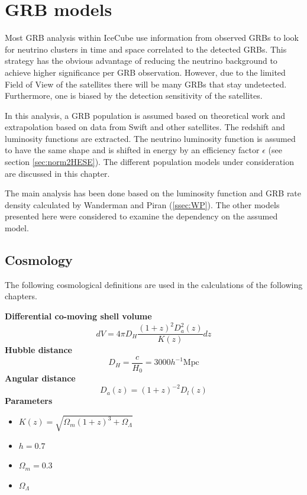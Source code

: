 \section{GRB models}
\label{sec:GRB_models}
Most GRB analysis within IceCube use information from observed GRBs to look
for neutrino clusters in time and space correlated to the detected GRBs.
This strategy has the obvious advantage of reducing the neutrino background to
achieve higher significance per GRB observation. However, due to the limited
Field of View of the satellites there will be many GRBs that stay undetected.
Furthermore, one is biased by the detection sensitivity of the satellites.

In this analysis, a GRB population is assumed based on theoretical work and
extrapolation based on data from Swift and other satellites. The redshift and
luminosity functions are extracted.
The neutrino luminosity function is assumed to have the same shape and is
shifted in energy by an efficiency factor $\epsilon$ (see section 
\ref{sec:norm2HESE}).
The different population models under consideration are discussed in this
chapter.

The main analysis has been done based on the luminosity function and GRB rate
density calculated by Wanderman and Piran (\ref{ssec:WP}). 
The other models presented here were considered to examine the dependency on
the assumed model.

\subsection{Cosmology}
The following cosmological definitions are used in the calculations of the 
following chapters.

\textbf{Differential co-moving shell volume} 
\begin{equation}
dV = 4 \pi D_H \frac{(1+z)^2D_a^2(z)}{K(z)}dz
\end{equation}
\textbf{Hubble distance}
\begin{equation}
 D_H = \frac{c}{H_0} = 3000 h^{-1}\text{Mpc}
\end{equation}
\textbf{Angular distance}
\begin{equation}
 D_a(z) = (1+z)^{-2} D_l(z)
\end{equation}
\textbf{Parameters} 
\begin{itemize}
  \item  $K(z) = \sqrt{\Omega_m (1 + z)^3 + \Omega_{\Lambda}}$
 \item $h=0.7$
 \item $\Omega_m = 0.3$
 \item $\Omega_\Lambda$
\end{itemize}

